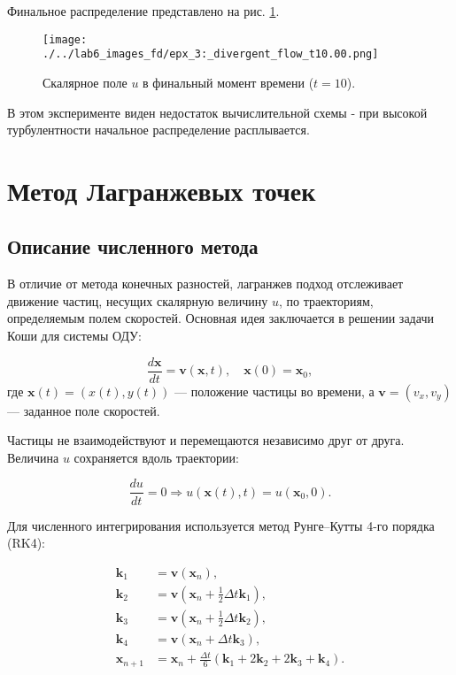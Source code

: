 \newpage
Финальное распределение представлено на рис. \ref{fig:div_final}.
\begin{figure}
	\centering
	\texttt{[image: ./../lab6\_images\_fd/epx\_3:\_divergent\_flow\_t10.00.png]}
	\caption{Скалярное поле \(u\) в финальный момент времени ($t=10$).}
	\label{fig:div_final}
\end{figure}

В этом эксперименте виден недостаток вычислительной схемы - при высокой турбулентности начальное распределение расплывается.


\newpage

\section{Метод Лагранжевых точек}
\subsection{Описание численного метода}

В отличие от метода конечных разностей, лагранжев подход отслеживает движение частиц, несущих скалярную величину \( u \), по траекториям, определяемым полем скоростей. Основная идея заключается в решении задачи Коши для системы ОДУ:

\[
\frac{d \mathbf{x}}{dt} = \mathbf{v}(\mathbf{x}, t), \quad \mathbf{x}(0) = \mathbf{x}_0,
\]
где \( \mathbf{x}(t) = (x(t), y(t)) \) — положение частицы во времени, а \( \mathbf{v} = (v_x, v_y) \) — заданное поле скоростей.

Частицы не взаимодействуют и перемещаются независимо друг от друга. Величина \( u \) сохраняется вдоль траектории:

\[
\frac{du}{dt} = 0 \Rightarrow u(\mathbf{x}(t), t) = u(\mathbf{x}_0, 0).
\]

Для численного интегрирования используется метод Рунге–Кутты 4-го порядка (RK4):

\begin{equation}
	\begin{aligned}
		\mathbf{k}_1 &= \mathbf{v}(\mathbf{x}_n), \\
		\mathbf{k}_2 &= \mathbf{v}(\mathbf{x}_n + \tfrac{1}{2} \Delta t \mathbf{k}_1), \\
		\mathbf{k}_3 &= \mathbf{v}(\mathbf{x}_n + \tfrac{1}{2} \Delta t \mathbf{k}_2), \\
		\mathbf{k}_4 &= \mathbf{v}(\mathbf{x}_n + \Delta t \mathbf{k}_3), \\
		\mathbf{x}_{n+1} &= \mathbf{x}_n + \frac{\Delta t}{6} (\mathbf{k}_1 + 2\mathbf{k}_2 + 2\mathbf{k}_3 + \mathbf{k}_4).
	\end{aligned}
	\label{eq:rk4}
\end{equation}

